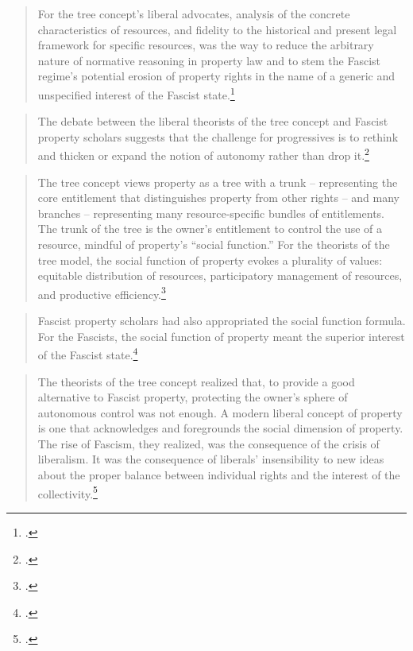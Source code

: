 \begin{quote}
For the tree concept's liberal advocates, analysis of the concrete characteristics of resources,
and fidelity to the historical and present legal framework for specific resources,
was the way to reduce the arbitrary nature of normative reasoning in property law and to stem the Fascist regime's potential erosion of property rights in the name of a generic and
unspecified interest of the Fascist state.\footcite[911-912]{robilant13}
\end{quote}

\begin{quote}
The debate between the liberal theorists of the tree concept and Fascist property
scholars suggests that the challenge for progressives is to rethink and
thicken or expand the notion of autonomy rather than drop it.\footcite[928]{robilant13}
\end{quote}

\begin{quote}
The tree concept views property as a tree with a trunk -- representing
the core entitlement that distinguishes property from other rights -- and many branches -- representing
many resource-specific bundles of entitlements. The trunk of the tree is the owner's entitlement to control the use of a resource,
mindful of property's ``social function.'' For the theorists of the tree model, the social function of property evokes a plurality of values: equitable distribution of resources, participatory management of resources, and productive efficiency.\footnote{\cite[872]{robilant13}.}
\end{quote}

\begin{quote}
Fascist property scholars had also appropriated the social function formula. For the Fascists,
the social function of property meant the superior interest of the Fascist state.\footcite[908-909]{robilant13}
\end{quote}

\begin{quote}
The theorists of the tree concept realized that,
to provide a good alternative to Fascist property, protecting the owner's sphere of
autonomous control was not enough. A modern liberal concept of
property is one that acknowledges and
foregrounds the social dimension of property. The rise of Fascism, they realized, was the
consequence of the crisis of liberalism. It was the consequence of liberals' insensibility to new ideas about the proper balance between individual rights and the interest of the collectivity.\footcite[907]{robilant13}
\end{quote}


